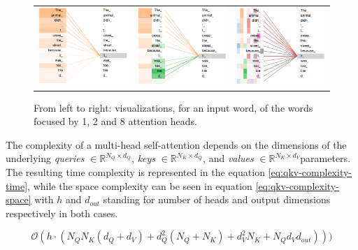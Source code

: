 \begin{figure}[!hpt]
  \centering
  \begin{tabular}{ccc}
      {\includegraphics[width=0.32\columnwidth]{background/attention_1_head.png}} &
      {\includegraphics[width=0.32\columnwidth]{background/attention_2_head.png}} & 
      {\includegraphics[width=0.32\columnwidth]{background/attention_8_head.png}}
  \end{tabular}
  \caption{From left to right: visualizations, for an input word, of the words focused by 1, 2 and 8 attention heads.}
  \label{fig:1-2-8-heads}
\end{figure}

The complexity of a multi-head self-attention depends on the dimensions of the underlying \textit{queries} \(\in \mathbb{R}^{N_Q \times d_Q}\), \textit{keys} \(\in \mathbb{R}^{N_K \times d_Q}\), and \textit{values} \(\in \mathbb{R}^{N_K \times d_V}\)parameters. The resulting time complexity is represented in the equation \ref{eq:qkv-complexity-time}, while the space complexity can be seen in equation \ref{eq:qkv-complexity-space} with \(h\) and \(d_{out}\) standing for number of heads and output dimensions respectively in both cases.

\begin{equation}\label{eq:qkv-complexity-time}
  \mathcal{O}(h \cdot (N_Q N_K (d_Q + d_V) + d_Q^2 (N_Q + N_K) + d_V^2 N_K + N_Q d_V d_{out}) ))
\end{equation}

